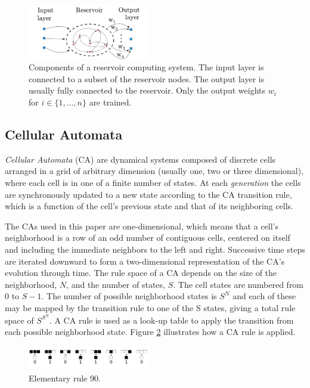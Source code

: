 \documentclass{elsarticle}
\begin{document}
\begin{multicols}{2}
\begin{figure}[H]
        \centering
            \includegraphics[width=0.475\textwidth]{Reservoir2.pdf}
    \caption{Components of a reservoir computing system. The input layer is connected to 
        a subset of the reservoir nodes. The output layer is usually fully connected to the 
            reservoir. Only the output weights $w_{i}$ for $i \in \{1, ..., 
            n\}$ are trained.} 
        
            \label{reservoir_layout}
            \end{figure}

\subsection{Cellular Automata}
\textit{Cellular Automata} (CA) are dynamical systems composed of discrete cells 
arranged in a grid of arbitrary dimension (usually one, two or three 
        dimensional), where each cell is in one of a finite number of states.  
At each \textit{generation} the cells are synchronously updated to a new state 
according to the CA transition rule, which is a function of the cell's previous 
state and that of its neighboring cells. \par
The CAs used in this paper are one-dimensional, which means that a cell's 
neighborhood is a row of an odd number of contiguous cells, centered on itself 
and including the immediate neighbors to the left and right.  Successive 
time steps are iterated downward to form a two-dimensional representation of the 
CA's evolution through time. The rule space of a CA depends on the size of the 
neighborhood, $N$, and the number of states, $S$. The cell states are numbered from 
0 to $S - 1$. The number of possible neighborhood states is $ S^N $ and each of 
these may be mapped by the transition rule to one of the S states, giving a 
total rule space of $ S^{S^N} $. A CA rule is used as a look-up table to apply 
the transition from each possible neighborhood state. Figure \ref{ca_rule} 
illustrates how a CA rule is applied.
\begin{figure}[H]
  \centering
    \includegraphics[width=0.475\textwidth]{Rule90.pdf}
    \caption{Elementary rule 90.}
        \label{ca_rule}
        \end{figure}


\end{multicols}
\end{document}
